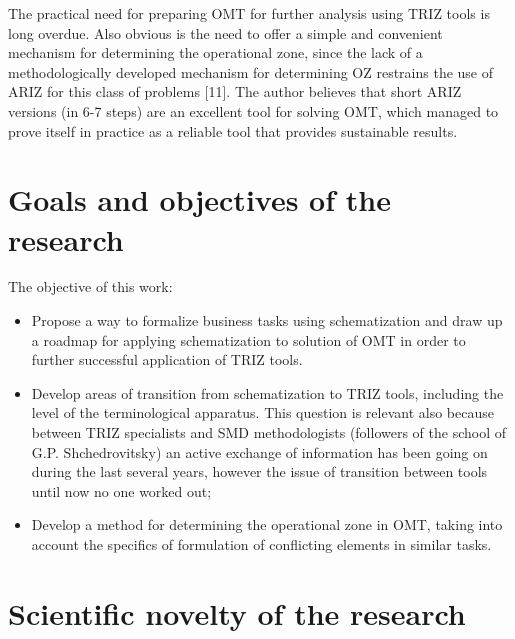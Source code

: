 \documentclass[11pt,a4paper]{book}
\begin{document}
The practical need for preparing OMT for further analysis using TRIZ tools is
long overdue. Also obvious is the need to offer a simple and convenient
mechanism for determining the operational zone, since the lack of a
methodologically developed mechanism for determining OZ restrains the use of
ARIZ for this class of problems [11]. The author believes that short ARIZ
versions (in 6-7 steps) are an excellent tool for solving OMT, which managed
to prove itself in practice as a reliable tool that provides sustainable
results.

\section{Goals and objectives of the research}
The objective of this work:
\begin{itemize}
\item Propose a way to formalize business tasks using schematization and draw
  up a roadmap for applying schematization to solution of OMT in order to
  further successful application of TRIZ tools.
\item Develop areas of transition from schematization to TRIZ tools, including
  the level of the terminological apparatus. This question is relevant also
  because between TRIZ specialists and SMD methodologists (followers of the
  school of G.P. Shchedrovitsky) an active exchange of information has been
  going on during the last several years, however the issue of transition
  between tools until now no one worked out;
\item Develop a method for determining the operational zone in OMT, taking
  into account the specifics of formulation of conflicting elements in similar
  tasks.
\end{itemize}

\section{Scientific novelty of the research}
\end{document}
